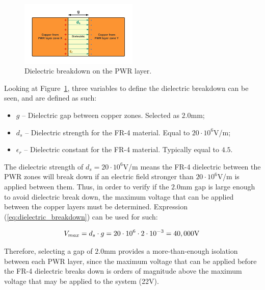 \begin{figure}[h]
    \centering
    \includegraphics[width=0.5\textwidth]{Chapters/Figures/chapter5/dielectric_breakdown.pdf}
    \caption{Dielectric breakdown on the PWR layer.}
    \label{fig:dielectric_breakdown}
\end{figure}

Looking at Figure~\ref{fig:dielectric_breakdown}, three variables to define the dielectric breakdown can be seen, and are defined as such:
\begin{itemize}
	\item $g$ -- Dielectric gap between copper zones. Selected as $2.0$mm;
	
	\item $d_s$ -- Dielectric strength for the FR-4 material. Equal to $20 \cdot 10^{6}$V/m;
	
	\item $\epsilon_r$ -- Dielectric constant for the FR-4 material. Typically equal to $4.5$.
\end{itemize}

The dielectric strength of $d_s=20 \cdot 10^{6}$V/m means the FR-4 dielectric between the PWR zones will break down if an electric field stronger than $20 \cdot 10^{6}$V/m is applied between them. Thus, in order to verify if the $2.0$mm gap is large enough to avoid dielectric break down, the maximum voltage that can be applied between the copper layers must be determined. Expression (\ref{eq:dielectric_breakdown}) can be used for such:

\begin{equation}\label{eq:dielectric_breakdown}
	V_{max} = d_s \cdot g = 20 \cdot 10^{6} \cdot 2 \cdot 10^{-3} = 40,000 \textrm{V}\,\medskip
\end{equation}

Therefore, selecting a gap of $2.0$mm provides a more-than-enough isolation between each PWR layer, since the maximum voltage that can be applied before the FR-4 dielectric breaks down is orders of magnitude above the maximum voltage that may be applied to the system (22V).

